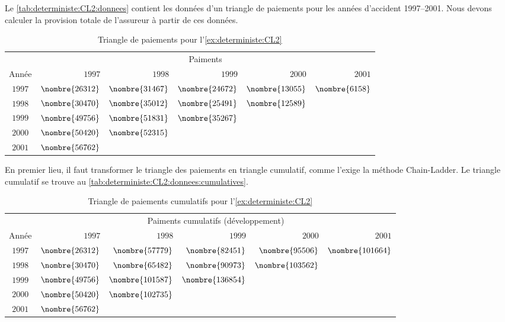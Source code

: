 \begin{exemple}
  \label{ex:deterministe:CL2}
  Le \autoref{tab:deterministe:CL2:donnees} contient les données d'un
  triangle de paiements pour les années d'accident 1997--2001. Nous
  devons calculer la provision totale de l'assureur à partir de ces
  données.

  \begin{table}
    \centering
    \caption{Triangle de paiements pour
      l'\autoref{ex:deterministe:CL2}}
    \label{tab:deterministe:CL2:donnees}
    \begin{tabular}{crrrrr}
      \toprule
      & \multicolumn{5}{c}{Paiments} \\
      Année & $1997$ & $1998$ & $1999$ & $2000$ & $2001$  \\
      \midrule
      $1997$ & $\nombre{26312}$ & $\nombre{31467}$ & $\nombre{24672}$ & $\nombre{13055}$ & $\nombre{6158}$ \\
      $1998$ & $\nombre{30470}$ & $\nombre{35012}$ & $\nombre{25491}$ & $\nombre{12589}$ \\
      $1999$ & $\nombre{49756}$ & $\nombre{51831}$ & $\nombre{35267}$ \\
      $2000$ & $\nombre{50420}$ & $\nombre{52315}$ \\
      $2001$ & $\nombre{56762}$ \\
      \bottomrule
    \end{tabular}
  \end{table}

  En premier lieu, il faut transformer le triangle des paiements en
  triangle cumulatif, comme l'exige la méthode Chain-Ladder. Le
  triangle cumulatif se trouve au
  \autoref{tab:deterministe:CL2:donnees:cumulatives}.

  \begin{table}
    \centering
    \caption{Triangle de paiements cumulatifs pour
      l'\autoref{ex:deterministe:CL2}}
    \label{tab:deterministe:CL2:donnees:cumulatives}
    \begin{tabular}{crrrrr}
      \toprule
      & \multicolumn{5}{c}{Paiments cumulatifs (développement)} \\
      Année & $1997$ & $1998$ & $1999$ & $2000$ & $2001$  \\
      \midrule
      $1997$ & $\nombre{26312}$ & $\nombre{57779}$  & $\nombre{82451}$ & $\nombre{95506}$ & $\nombre{101664}$\\
      $1998$ & $\nombre{30470}$ & $\nombre{65482}$  & $\nombre{90973}$ & $\nombre{103562}$ \\
      $1999$ & $\nombre{49756}$ & $\nombre{101587}$ & $\nombre{136854}$	\\
      $2000$ & $\nombre{50420}$ & $\nombre{102735}$ \\
      $2001$ & $\nombre{56762}$ \\
      \bottomrule
    \end{tabular}
  \end{table}


\end{exemple}
